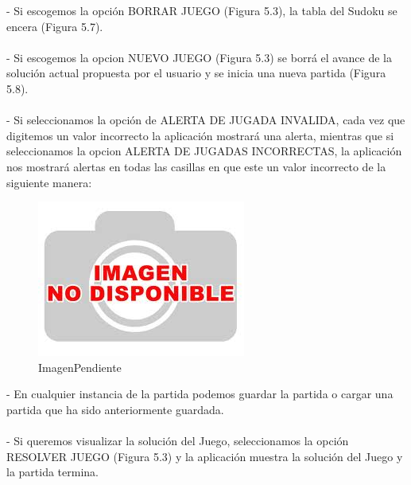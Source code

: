 \begin{center}
- Si escogemos la opción BORRAR JUEGO (Figura 5.3), la tabla del Sudoku se encera (Figura 5.7). 
\ \\ \ \\ 

- Si escogemos la opcion NUEVO JUEGO (Figura 5.3)  se borrá el avance de la solución actual propuesta por el usuario y se inicia una nueva partida (Figura 5.8). 
\ \\ \ \\ 

- Si seleccionamos la opción de ALERTA DE JUGADA INVALIDA, cada vez que digitemos un valor incorrecto la aplicación mostrará una alerta, mientras que si seleccionamos la opcion ALERTA DE JUGADAS INCORRECTAS, la aplicación nos mostrará alertas en todas las casillas en que este un valor incorrecto de la siguiente manera:
\end{center} 
 
\begin{figure}[htbp]
\begin{center}
\includegraphics[width=.60\textwidth]{./imagenes/NoDisponible.png}
\caption{ImagenPendiente}
\label{ImagenPendiente}
\end{center}
\end{figure}

\begin{center}
- En cualquier instancia de la partida podemos guardar la partida o cargar una partida que ha sido anteriormente guardada. 
\ \\ \ \\ 

- Si queremos visualizar la solución del Juego, seleccionamos la opción RESOLVER JUEGO (Figura 5.3) y la aplicación muestra la solución del Juego y la partida termina.
\end{center} 

